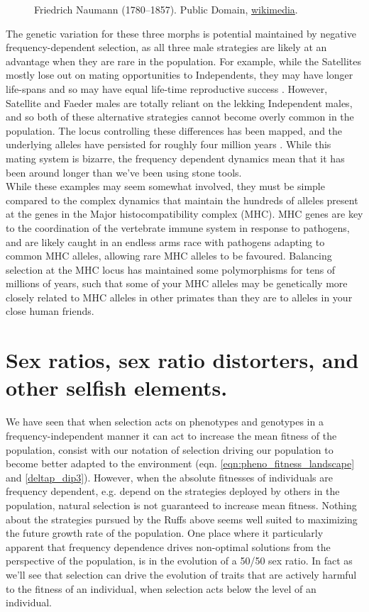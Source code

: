 {\begin{figure}
{{{    Friedrich Naumann (1780–1857). Public Domain,
    \href{https://en.wikipedia.org/wiki/Ruff\#/media/File:Philomachus_pugnax_naumann.jpg}{wikimedia}.}}}\label{fig:Ruff}  
\end{figure}
The genetic variation for these three morphs is potential maintained by
negative frequency-dependent selection, as all three male strategies
are likely at an advantage when they are rare in the population. For
example, while the Satellites mostly lose out on mating opportunities
to Independents, they may have longer life-spans and so may have equal
life-time reproductive success \citep{widemo1998alternative}. However, Satellite and Faeder males
are totally reliant on the lekking Independent males, and so both of
these alternative strategies cannot become overly common in the
population. The locus controlling these differences has been mapped,
and the underlying alleles have persisted for roughly four million years
\citep{kupper2016supergene,lamichhaney2016structural}. While this mating system is
bizarre, the frequency dependent dynamics mean that it has been around
longer than we've been using stone tools. \\ 

While these examples may seem somewhat involved, they must be simple
compared to the complex dynamics that maintain the hundreds of alleles
present at the genes in the Major histocompatibility complex (MHC). MHC
genes are key to the coordination of the vertebrate immune
system in response to pathogens, and are likely caught in an endless arms
race with pathogens adapting to common MHC alleles, allowing rare MHC
alleles to be favoured. Balancing selection at the MHC locus has maintained
some polymorphisms for tens of millions of years, such that some of
your MHC alleles may be genetically more closely related to MHC alleles in other primates than they are to alleles in your
close human friends. 


\section{Sex ratios, sex ratio distorters, and other selfish
  elements. }

We have seen that when selection acts on phenotypes and genotypes in a
frequency-independent manner it can act to
increase the mean fitness of the population, consist with our
notation of selection driving our population to become better adapted
to the environment (eqn. \eqref{eqn:pheno_fitness_landscape} and \eqref{deltap_dip3}). However, when the
absolute fitnesses of individuals are frequency dependent, e.g. depend
on the strategies deployed by others in the population, natural
selection is not guaranteed to increase mean fitness. Nothing about
the strategies pursued by the Ruffs above seems well suited to
maximizing the future growth rate of the population. 
One place where it particularly apparent that frequency dependence
drives non-optimal solutions from the perspective of the population, is in the evolution of a 50/50 sex
ratio. In fact as we'll see that selection can drive the evolution of
traits that are actively harmful to the fitness of an individual, when
selection acts below the level of an individual. 

}
